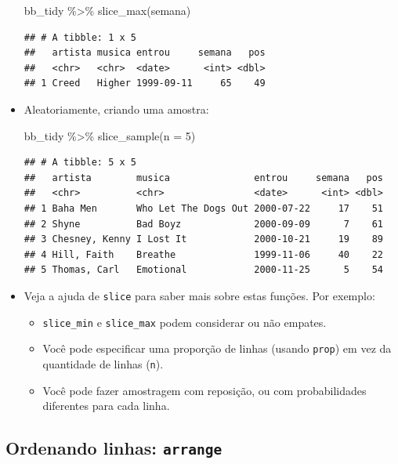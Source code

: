 \documentclass[
  11pt]{report}
\newenvironment{Shaded}{\begin{snugshade}}{\end{snugshade}}
\newcommand{\AttributeTok}[1]{\textcolor[rgb]{0.77,0.63,0.00}{#1}}
\newcommand{\DecValTok}[1]{\textcolor[rgb]{0.00,0.00,0.81}{#1}}
\newcommand{\FunctionTok}[1]{\textcolor[rgb]{0.00,0.00,0.00}{#1}}
\newcommand{\NormalTok}[1]{#1}
\newcommand{\SpecialCharTok}[1]{\textcolor[rgb]{0.00,0.00,0.00}{#1}}
\renewenvironment{Shaded}{
    \begin{mdframed}[%
      roundcorner=2pt,%
      innerleftmargin=5pt,%
      innerrightmargin=5pt,%
      topline=true,%
      leftline=true,%
      rightline=true,%
      bottomline=true,%
      linewidth=0.5pt,%
      linecolor=black!20,%
      backgroundcolor=black!2,%
      skipabove=2ex,%
      skipbelow=2.5ex%
    ]%
  }
  {
    \end{mdframed}
  }
\begin{document}
\begin{itemize}
\begin{Shaded}
\begin{Highlighting}[]
\NormalTok{bb\_tidy }\SpecialCharTok{\%\textgreater{}\%} 
  \FunctionTok{slice\_max}\NormalTok{(semana)}
\end{Highlighting}
\end{Shaded}

\begin{verbatim}
## # A tibble: 1 x 5
##   artista musica entrou     semana   pos
##   <chr>   <chr>  <date>      <int> <dbl>
## 1 Creed   Higher 1999-09-11     65    49
\end{verbatim}
\item
  Aleatoriamente, criando uma amostra:

\begin{Shaded}
\begin{Highlighting}[]
\NormalTok{bb\_tidy }\SpecialCharTok{\%\textgreater{}\%} 
  \FunctionTok{slice\_sample}\NormalTok{(}\AttributeTok{n =} \DecValTok{5}\NormalTok{)}
\end{Highlighting}
\end{Shaded}

\begin{verbatim}
## # A tibble: 5 x 5
##   artista        musica               entrou     semana   pos
##   <chr>          <chr>                <date>      <int> <dbl>
## 1 Baha Men       Who Let The Dogs Out 2000-07-22     17    51
## 2 Shyne          Bad Boyz             2000-09-09      7    61
## 3 Chesney, Kenny I Lost It            2000-10-21     19    89
## 4 Hill, Faith    Breathe              1999-11-06     40    22
## 5 Thomas, Carl   Emotional            2000-11-25      5    54
\end{verbatim}
\item
  Veja a ajuda de \texttt{slice} para saber mais sobre estas funções. Por exemplo:

  \begin{itemize}
  \item
    \texttt{slice\_min} e \texttt{slice\_max} podem considerar ou não empates.
  \item
    Você pode especificar uma proporção de linhas (usando \texttt{prop}) em vez da quantidade de linhas (\texttt{n}).
  \item
    Você pode fazer amostragem com reposição, ou com probabilidades diferentes para cada linha.
  \end{itemize}
\end{itemize}

\hypertarget{ordenando-linhas-arrange}{%
\subsection{\texorpdfstring{Ordenando linhas: \texttt{arrange}}{Ordenando linhas: arrange}}\label{ordenando-linhas-arrange}}
\end{document}
